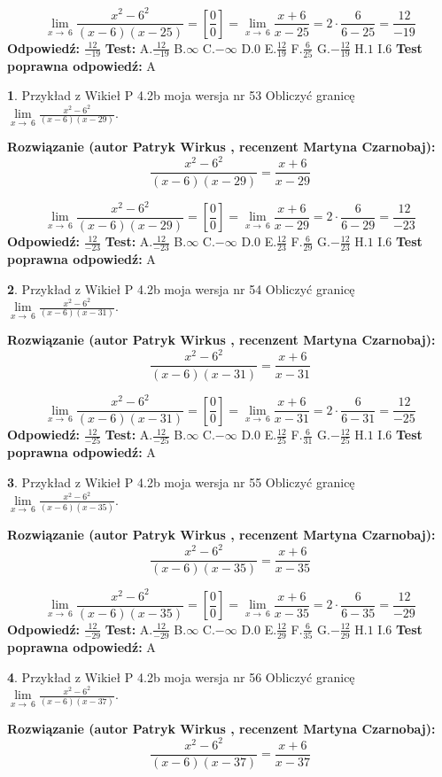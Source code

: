 \documentclass[12pt, a4paper]{article}
\theoremstyle{definition} %
\newtheorem{zad}{}
\newcommand{\zadStart}[1]{\begin{zad}#1\newline}
\newcommand{\zadStop}{\end{zad}}
\newcommand{\rozwStart}[2]{\noindent \textbf{Rozwiązanie (autor #1 , recenzent #2): }\newline}
\newcommand{\rozwStop}{\newline}
\newcommand{\odpStart}{\noindent \textbf{Odpowiedź:}\newline}
\newcommand{\odpStop}{\newline}
\newcommand{\testStart}{\noindent \textbf{Test:}\newline}
\newcommand{\testStop}{\newline}
\newcommand{\kluczStart}{\noindent \textbf{Test poprawna odpowiedź:}\newline}
\newcommand{\kluczStop}{\newline}
\begin{document}
$$\lim\limits_{x\to\ 6}\frac{x^{2}-6^{2}}{(x-6)(x-25)}=[\frac{0}{0}]=\lim\limits_{x\to\ 6}\frac{x+6}{x-25}=2 \cdot \frac{6}{6-25} = \frac{12}{-19}$$
\rozwStop
\odpStart
$\frac{12}{-19}$
\odpStop
\testStart
A.$\frac{12}{-19}$
B.$\infty$
C.$-\infty$
D.$0$
E.$\frac{12}{19}$
F.$\frac{6}{25}$
G.$-\frac{12}{19}$
H.$1$
I.$6$
\testStop
\kluczStart
A
\kluczStop



\zadStart{Przykład z Wikieł P 4.2b moja wersja nr 53}
Obliczyć granicę $\lim\limits_{x\to\ 6}\frac{x^{2}-6^{2}}{(x-6)(x-29)}$.
\zadStop
\rozwStart{Patryk Wirkus}{Martyna Czarnobaj}
$$\frac{x^{2}-6^{2}}{(x-6)(x-29)}=\frac{x+6}{x-29}$$

$$\lim\limits_{x\to\ 6}\frac{x^{2}-6^{2}}{(x-6)(x-29)}=[\frac{0}{0}]=\lim\limits_{x\to\ 6}\frac{x+6}{x-29}=2 \cdot \frac{6}{6-29} = \frac{12}{-23}$$
\rozwStop
\odpStart
$\frac{12}{-23}$
\odpStop
\testStart
A.$\frac{12}{-23}$
B.$\infty$
C.$-\infty$
D.$0$
E.$\frac{12}{23}$
F.$\frac{6}{29}$
G.$-\frac{12}{23}$
H.$1$
I.$6$
\testStop
\kluczStart
A
\kluczStop



\zadStart{Przykład z Wikieł P 4.2b moja wersja nr 54}
Obliczyć granicę $\lim\limits_{x\to\ 6}\frac{x^{2}-6^{2}}{(x-6)(x-31)}$.
\zadStop
\rozwStart{Patryk Wirkus}{Martyna Czarnobaj}
$$\frac{x^{2}-6^{2}}{(x-6)(x-31)}=\frac{x+6}{x-31}$$

$$\lim\limits_{x\to\ 6}\frac{x^{2}-6^{2}}{(x-6)(x-31)}=[\frac{0}{0}]=\lim\limits_{x\to\ 6}\frac{x+6}{x-31}=2 \cdot \frac{6}{6-31} = \frac{12}{-25}$$
\rozwStop
\odpStart
$\frac{12}{-25}$
\odpStop
\testStart
A.$\frac{12}{-25}$
B.$\infty$
C.$-\infty$
D.$0$
E.$\frac{12}{25}$
F.$\frac{6}{31}$
G.$-\frac{12}{25}$
H.$1$
I.$6$
\testStop
\kluczStart
A
\kluczStop



\zadStart{Przykład z Wikieł P 4.2b moja wersja nr 55}
Obliczyć granicę $\lim\limits_{x\to\ 6}\frac{x^{2}-6^{2}}{(x-6)(x-35)}$.
\zadStop
\rozwStart{Patryk Wirkus}{Martyna Czarnobaj}
$$\frac{x^{2}-6^{2}}{(x-6)(x-35)}=\frac{x+6}{x-35}$$

$$\lim\limits_{x\to\ 6}\frac{x^{2}-6^{2}}{(x-6)(x-35)}=[\frac{0}{0}]=\lim\limits_{x\to\ 6}\frac{x+6}{x-35}=2 \cdot \frac{6}{6-35} = \frac{12}{-29}$$
\rozwStop
\odpStart
$\frac{12}{-29}$
\odpStop
\testStart
A.$\frac{12}{-29}$
B.$\infty$
C.$-\infty$
D.$0$
E.$\frac{12}{29}$
F.$\frac{6}{35}$
G.$-\frac{12}{29}$
H.$1$
I.$6$
\testStop
\kluczStart
A
\kluczStop



\zadStart{Przykład z Wikieł P 4.2b moja wersja nr 56}
Obliczyć granicę $\lim\limits_{x\to\ 6}\frac{x^{2}-6^{2}}{(x-6)(x-37)}$.
\zadStop
\rozwStart{Patryk Wirkus}{Martyna Czarnobaj}
$$\frac{x^{2}-6^{2}}{(x-6)(x-37)}=\frac{x+6}{x-37}$$
\end{document}
